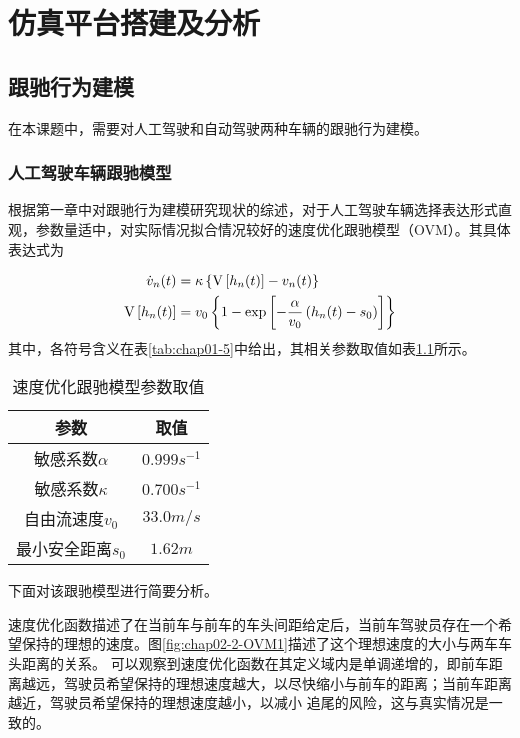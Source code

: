 
\chapter{仿真平台搭建及分析}

\section{跟驰行为建模}
\label{sec:2.2}

在本课题中，需要对人工驾驶和自动驾驶两种车辆的跟驰行为建模。

\subsection{人工驾驶车辆跟驰模型}

根据第一章中对跟驰行为建模研究现状的综述，对于人工驾驶车辆选择表达形式直观，参数量适中，对实际情况拟合情况较好的速度优化跟驰模型（OVM）。其具体表达式为

\begin{align}
  \dot{v}_n(t) &= \kappa \left\{ \mathrm{V} \left[ h_n(t) \right] - v_n(t) \right\} \notag \\
  \mathrm{V} \left[ h_n(t) \right] &= v_0 \left\{ 1 - \exp \left[ - \frac{\alpha}{v_0}\left(h_n(t)-s_0\right) \right] \right\}
  \label{eq:chap02-1}
\end{align}
其中，各符号含义在表\ref{tab:chap01-5}中给出，其相关参数取值如表\ref{tab:chap02-1}所示。

\begin{table}
  \centering
  \caption{速度优化跟驰模型参数取值}
  \begin{tabular}{cc}
    \toprule
    参数          &  取值                         \\
    \midrule
    敏感系数$\alpha$        & $0.999s^{-1}$         \\
    敏感系数$\kappa$       & $0.700s^{-1}$             \\
    自由流速度$v_0$             & $33.0 m/s$          \\
    最小安全距离$s_0$             & $1.62m$        \\
    \bottomrule
  \end{tabular}
  \label{tab:chap02-1}
\end{table}

下面对该跟驰模型进行简要分析。

速度优化函数描述了在当前车与前车的车头间距给定后，当前车驾驶员存在一个希望保持的理想的速度。图\ref{fig:chap02-2-OVM1}描述了这个理想速度的大小与两车车头距离的关系。
可以观察到速度优化函数在其定义域内是单调递增的，即前车距离越远，驾驶员希望保持的理想速度越大，以尽快缩小与前车的距离；当前车距离越近，驾驶员希望保持的理想速度越小，以减小
追尾的风险，这与真实情况是一致的。

